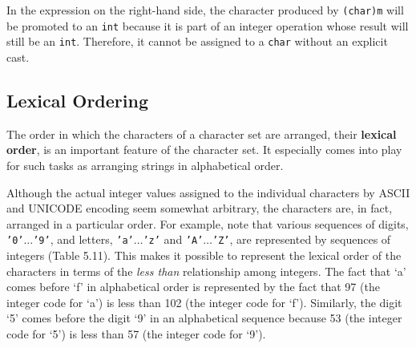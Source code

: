 \noindent In the expression on the right-hand side, the
character produced by {\tt (char)m} will be promoted to an {\tt int}
because it is part of an integer operation whose result will still be
an {\tt int}.  Therefore, it cannot be assigned to a {\tt char} without
an explicit cast.

\label{self-study-exercise}




\subsection{Lexical Ordering}
\noindent The order in which the characters of a character set 
are arranged, their {\bf lexical order}, is an important feature
of the character set. It especially comes into play for such
tasks as arranging strings in alphabetical order. 

Although the actual integer values assigned to the individual
characters by ASCII and UNICODE encoding seem somewhat arbitrary, the
characters are, in fact, arranged in a particular order.  For example,
note that various sequences of digits, {\tt '0'$\ldots$'9'}, and
letters, {\tt 'a'$\ldots$'z'} and {\tt 'A'$\ldots$'Z'}, are
represented by sequences of integers (Table 5.11). This makes it
possible to represent the lexical order of the characters in terms of
the {\it less than} relationship among integers.  The fact that `a'
comes before `f' in alphabetical order is represented by the fact that
97 (the integer code for `a') is less than 102 (the integer code for
`f'). Similarly, the digit `5' comes before the digit `9' in an
alphabetical sequence because 53 (the integer code for `5') is less
than 57 (the integer code for `9').

